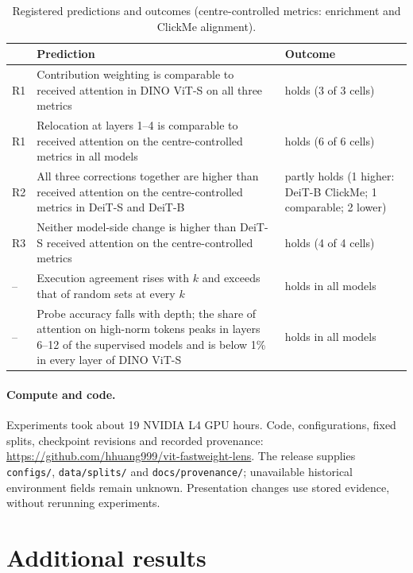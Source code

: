 \begin{table}[!htbp]
\caption{Registered predictions and outcomes (centre-controlled metrics: enrichment and ClickMe alignment).}
\label{tab:app-registered}
\centering\footnotesize
\setlength{\tabcolsep}{4pt}
\begin{tabular}{@{}l>{\raggedright\arraybackslash}p{3.55in}>{\raggedright\arraybackslash}p{1.35in}@{}}
\toprule
 & Prediction & Outcome\\
\midrule
R1 & Contribution weighting is comparable to received attention in DINO ViT-S on all three metrics & holds (3 of 3 cells)\\
R1 & Relocation at layers 1--4 is comparable to received attention on the centre-controlled metrics in all models & holds (6 of 6 cells)\\
R2 & All three corrections together are higher than received attention on the centre-controlled metrics in DeiT-S and DeiT-B & partly holds (1 higher: DeiT-B ClickMe; 1 comparable; 2 lower)\\
R3 & Neither model-side change is higher than DeiT-S received attention on the centre-controlled metrics & holds (4 of 4 cells)\\
\midrule
-- & Execution agreement rises with $k$ and exceeds that of random sets at every $k$ & holds in all models\\
-- & Probe accuracy falls with depth; the share of attention on high-norm tokens peaks in layers 6--12 of the supervised models and is below 1\% in every layer of DINO ViT-S & holds in all models\\
\bottomrule
\end{tabular}
\end{table}

\paragraph{Compute and code.} Experiments took about 19 NVIDIA L4 GPU hours. Code, configurations, fixed splits, checkpoint revisions and recorded provenance: \url{https://github.com/hhuang999/vit-fastweight-lens}. The release supplies \texttt{configs/}, \texttt{data/splits/} and \texttt{docs/provenance/}; unavailable historical environment fields remain unknown. Presentation changes use stored evidence, without rerunning experiments.

\section{Additional results}
\label{app:more}

